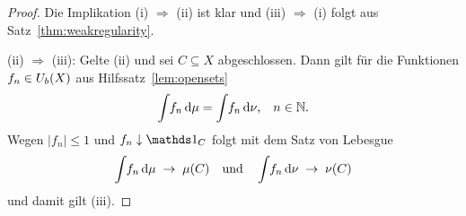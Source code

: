 \documentclass[../main/main.tex]{subfiles}
\begin{document}
	\begin{proof}
		Die Implikation (i) $\Rightarrow$ (ii) ist klar und (iii) 
		$\Rightarrow$ (i) folgt aus Satz~\ref{thm:weakregularity}.
		
		(ii) $\Rightarrow$ (iii): Gelte (ii) und sei $C \subseteq X$ abgeschlossen. 
		Dann gilt für die Funktionen $f_n \in U_b(X)$ aus Hilfssatz~\ref{lem:opensets}
		$$\int_{} \, f_n \, \mathrm{d}\mu = \int_{} \, f_n \, \mathrm{d}\nu\text{,} \quad n \in \mathbb{N} \text{.}$$
		Wegen $| f_n | \leq 1$ und $f_n \convdown \indfct_C$ folgt mit dem Satz von Lebesgue 
		$$\int_{} \, f_n \, \mathrm{d}\mu \; \to \; \mu(C) \quad \text{und} \quad \int_{} \, f_n \, \mathrm{d}\nu 
		\; \to \; \nu(C)$$
		und damit gilt (iii).
	\end{proof}
	
\end{document}
